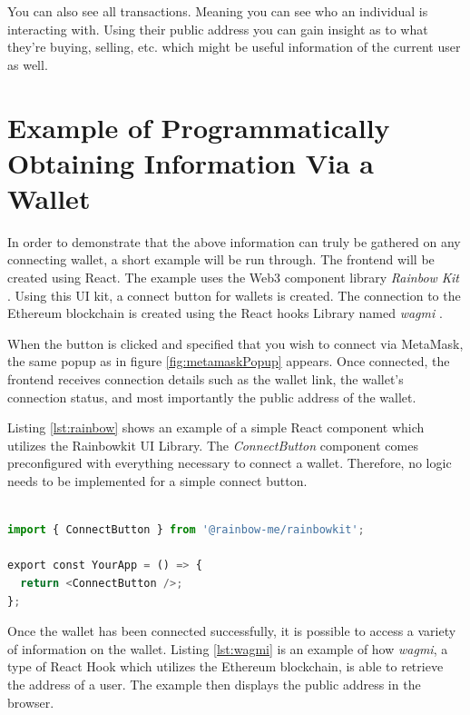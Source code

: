 You can also see all transactions. Meaning you can see who an individual is interacting with. Using their public address you can gain insight as to what they're buying, selling, etc. which might be useful information of the current user as well.

%
%
\section{Example of Programmatically Obtaining Information Via a Wallet}
\label{sec:methodology:code}
In order to demonstrate that the above information can truly be gathered on any connecting wallet, a short example will be run through. The frontend will be created using React. The example uses the Web3 component library \textit{Rainbow Kit} \cite{rainbowKit}. Using this UI kit, a connect button for wallets is created. The connection to the Ethereum blockchain is created using the React hooks Library named \textit{wagmi} \cite{wagmi}.

When the button is clicked and specified that you wish to connect via MetaMask, the same popup as in figure \ref{fig:metamaskPopup} appears. Once connected, the frontend receives connection details such as the wallet link, the wallet's connection status, and most importantly the public address of the wallet.

Listing \ref{lst:rainbow} shows an example of a simple React component which utilizes the Rainbowkit UI Library. The \textit{ConnectButton} component comes preconfigured with everything necessary to connect a wallet. Therefore, no logic needs to be implemented for a simple connect button.

\begin{center}
\begin{lstlisting}[label=lst:rainbow ,language=python, caption=An example of implementing a connect wallet button within the frontend of a webapp using the \textit{RainbowKit} UI Library \cite{rainbowKit}., captionpos=b]

import { ConnectButton } from '@rainbow-me/rainbowkit';

export const YourApp = () => {
  return <ConnectButton />;
};

\end{lstlisting}
\end{center}

Once the wallet has been connected successfully, it is possible to access a variety of information on the wallet. Listing \ref{lst:wagmi} is an example of how \textit{wagmi}, a type of React Hook which utilizes the Ethereum blockchain, is able to retrieve the address of a user. The example then displays the public address in the browser.


